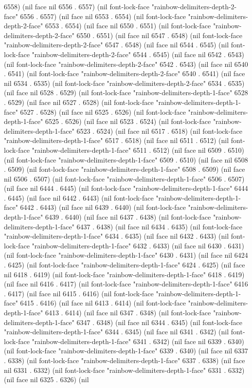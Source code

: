 6558) (nil face nil 6556 . 6557) (nil font-lock-face "rainbow-delimiters-depth-2-face" 6556 . 6557) (nil face nil 6553 . 6554) (nil font-lock-face "rainbow-delimiters-depth-2-face" 6553 . 6554) (nil face nil 6550 . 6551) (nil font-lock-face "rainbow-delimiters-depth-2-face" 6550 . 6551) (nil face nil 6547 . 6548) (nil font-lock-face "rainbow-delimiters-depth-2-face" 6547 . 6548) (nil face nil 6544 . 6545) (nil font-lock-face "rainbow-delimiters-depth-2-face" 6544 . 6545) (nil face nil 6542 . 6543) (nil font-lock-face "rainbow-delimiters-depth-2-face" 6542 . 6543) (nil face nil 6540 . 6541) (nil font-lock-face "rainbow-delimiters-depth-2-face" 6540 . 6541) (nil face nil 6534 . 6535) (nil font-lock-face "rainbow-delimiters-depth-2-face" 6534 . 6535) (nil face nil 6528 . 6529) (nil font-lock-face "rainbow-delimiters-depth-1-face" 6528 . 6529) (nil face nil 6527 . 6528) (nil font-lock-face "rainbow-delimiters-depth-1-face" 6527 . 6528) (nil face nil 6525 . 6526) (nil font-lock-face "rainbow-delimiters-depth-1-face" 6525 . 6526) (nil face nil 6523 . 6524) (nil font-lock-face "rainbow-delimiters-depth-1-face" 6523 . 6524) (nil face nil 6517 . 6518) (nil font-lock-face "rainbow-delimiters-depth-1-face" 6517 . 6518) (nil face nil 6511 . 6512) (nil font-lock-face "rainbow-delimiters-depth-1-face" 6511 . 6512) (nil face nil 6509 . 6510) (nil font-lock-face "rainbow-delimiters-depth-1-face" 6509 . 6510) (nil face nil 6508 . 6509) (nil font-lock-face "rainbow-delimiters-depth-1-face" 6508 . 6509) (nil face nil 6506 . 6507) (nil font-lock-face "rainbow-delimiters-depth-1-face" 6506 . 6507) (nil face nil 6444 . 6445) (nil font-lock-face "rainbow-delimiters-depth-1-face" 6444 . 6445) (nil face nil 6442 . 6443) (nil font-lock-face "rainbow-delimiters-depth-1-face" 6442 . 6443) (nil face nil 6439 . 6440) (nil font-lock-face "rainbow-delimiters-depth-1-face" 6439 . 6440) (nil face nil 6437 . 6438) (nil font-lock-face "rainbow-delimiters-depth-1-face" 6437 . 6438) (nil face nil 6434 . 6435) (nil font-lock-face "rainbow-delimiters-depth-1-face" 6434 . 6435) (nil face nil 6432 . 6433) (nil font-lock-face "rainbow-delimiters-depth-1-face" 6432 . 6433) (nil face nil 6430 . 6431) (nil font-lock-face "rainbow-delimiters-depth-1-face" 6430 . 6431) (nil face nil 6424 . 6425) (nil font-lock-face "rainbow-delimiters-depth-1-face" 6424 . 6425) (nil face nil 6418 . 6419) (nil font-lock-face "rainbow-delimiters-depth-1-face" 6418 . 6419) (nil face nil 6416 . 6417) (nil font-lock-face "rainbow-delimiters-depth-1-face" 6416 . 6417) (nil face nil 6415 . 6416) (nil font-lock-face "rainbow-delimiters-depth-1-face" 6415 . 6416) (nil face nil 6413 . 6414) (nil font-lock-face "rainbow-delimiters-depth-1-face" 6413 . 6414) (nil face nil 6347 . 6348) (nil font-lock-face "rainbow-delimiters-depth-1-face" 6347 . 6348) (nil face nil 6344 . 6345) (nil font-lock-face "rainbow-delimiters-depth-1-face" 6344 . 6345) (nil face nil 6341 . 6342) (nil font-lock-face "rainbow-delimiters-depth-1-face" 6341 . 6342) (nil face nil 6339 . 6340) (nil font-lock-face "rainbow-delimiters-depth-1-face" 6339 . 6340) (nil face nil 6337 . 6338) (nil font-lock-face "rainbow-delimiters-depth-1-face" 6337 . 6338) (nil face nil 6331 . 6332) (nil font-lock-face "rainbow-delimiters-depth-1-face" 6331 . 6332) (nil face nil 6325 . 6326) (nil 